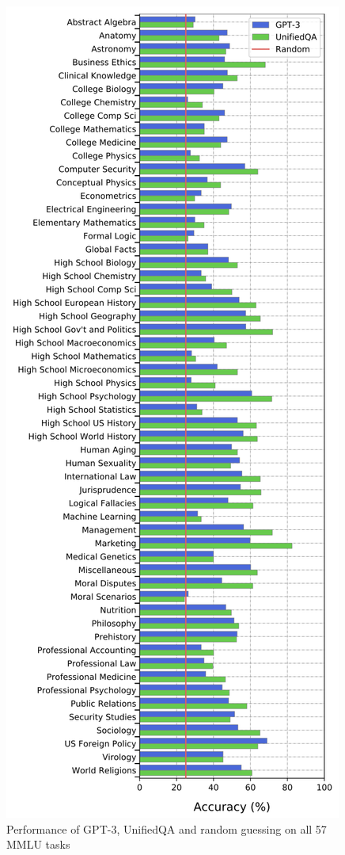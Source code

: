 \begin{figure}
        \centering
        \includegraphics[width=0.75\linewidth]{Course Project Template//images/mmlu-task-performance.png}
        \caption{Performance of GPT-3, UnifiedQA and random guessing on all 57 MMLU tasks\cite{hendrycks2021measuringmassivemultitasklanguage}}
        \label{fig:mmlu-tasks}
\end{figure}

